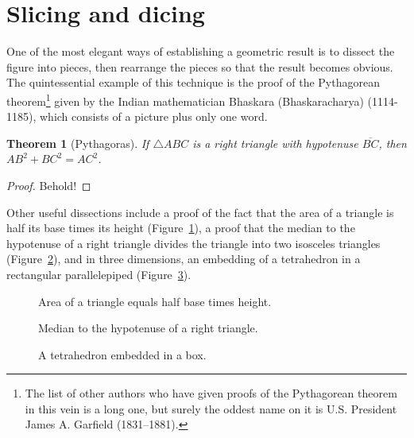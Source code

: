 \documentclass[12pt]{book}
\numberwithin{exc}{section}
\numberwithin{figure}{section}
\newtheorem{theorem}{Theorem}[section]
\numberwithin{equation}{theorem}
\def\seg#1{\overline{#1}}
\begin{document}
\section{Slicing and dicing}

One of the most elegant ways of establishing a geometric result is 
to dissect 
the figure into pieces, then rearrange the pieces so 
that the result becomes obvious. The quintessential example of this 
technique is the proof of the Pythagorean theorem\footnote{The list of other
authors who have given proofs of the Pythagorean theorem in this vein is a long
one, but surely the oddest name on it is U.S. President James A. Garfield
(1831--1881).}
given by
the Indian mathematician Bhaskara (Bhaskaracharya) (1114-1185),
which consists of a picture plus only one word.

\begin{theorem}[Pythagoras]
If $\triangle ABC$ is a right triangle with hypotenuse $\seg{BC}$, then $AB^{2} + 
BC^{2} = AC^{2}$.
\end{theorem}
\begin{proof}
Behold! 
\end{proof}


Other useful dissections include a proof of the fact that the area of 
a triangle
is half its base times its height (Figure~\ref{fig:baseheight}),
a proof that the median to the
hypotenuse of a right triangle divides the triangle into two isosceles
triangles (Figure~\ref{fig:medianhyp}),
and in three dimensions, an embedding of a tetrahedron in a
rectangular parallelepiped (Figure~\ref{fig:tetrainbox}).
\begin{figure}[ht]
\caption{Area of a triangle equals half base times height.}
\label{fig:baseheight}
\end{figure}
\begin{figure}[ht]
\caption{Median to the hypotenuse of a right triangle.}
\label{fig:medianhyp}
\end{figure}
\begin{figure}[ht]
\caption{A tetrahedron embedded in a box.}
\label{fig:tetrainbox}
\end{figure}
\end{document}
